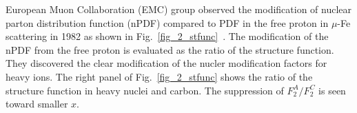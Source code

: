European Muon Collaboration (EMC) group observed the modification of nuclear parton distribution function (nPDF) compared to PDF in the free proton in $\mu$-Fe scattering in 1982 as shown in Fig.~\ref{fig_2_stfunc}~\cite{bib_emc}. 
The modification of the nPDF from the free proton is evaluated as the ratio of the structure function. 
They discovered the clear modification of the nucler modification factors for heavy ions. 
The right panel of Fig.~\ref{fig_2_stfunc} shows the ratio of the structure function in heavy nuclei and carbon. 
The suppression of $F^{A}_{2}/F^{C}_{2}$ is seen toward smaller $x$. 
